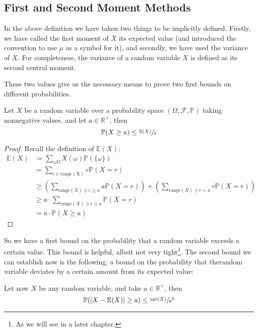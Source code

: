 	\subsection{First and Second Moment Methods}
		In the above definition we have taken two things to be implicitly defined. Firstly, we have called the first moment of $X$
		its expected value (and introduced the convention to use $\mu$ as a symbol for it), and secondly, we have used the 
		variance of $X$. For completeness, the variance of a random variable $X$ is defined as its second central moment. \par
		These two values give us the necessary means to prove two first bounds on different probabilities. 
		\begin{theorem}
			\label{theorem:markovineq}
			Let $X$ be a random variable over a probability space $(\Omega, \mathcal{F}, \mathbb{P})$
			taking nonnegative values, and let $a \in \mathbb{R}^+$, then
			$$
				\mathbb{P}(X \geq a) \leq \sfrac{\mathbb{E}(X)}{a}
			$$
		\end{theorem}
		\begin{proof}
			Recall the definition of $\mathbb{E}(X)$:
			\begin{align*}
				\mathbb{E}(X) &\coloneqq \sum_{\omega \Omega} X(\omega) \mathbb{P}(\{\omega\}) \\
						&= \sum_{r \in \mathrm{range(X)}} r \mathbb{P}(X = r) \\
						&\geq \left(\sum_{\mathrm{range}(X) \ni r \geq a} a \mathbb{P}(X=r)\right) + 
						      \left(\sum_{\mathrm{range}(X) \ni r < a} r \mathbb{P}(X=r)\right) \\
						&\geq a \cdot \sum_{\mathrm{range}(X) \ni r \geq a} \mathbb{P}(X=r) \\
						&= a \cdot \mathbb{P}(X \geq a) 
			\end{align*}
		\end{proof}
		So we have a first bound on the probability that a random variable exceeds a 
		certain value. This bound is helpful, albe\"it not very tight\footnote{As we will 
		see in a later chapter.}. The second bound we can establish now is the following, 
		a bound on the probability that therandom variable deviates by a certain amount 
		from its expected value:
		\begin{theorem}
			\label{theorem:chebineq}
			Let now $X$ be any random variable, and take $a \in \mathbb{R}^+$, then
			$$
				\mathbb{P}(\left| X - \mathbb{E}(X)\right| \geq a) \leq \sfrac{\mathrm{var}(X)}{a^2}
			$$
		\end{theorem}
